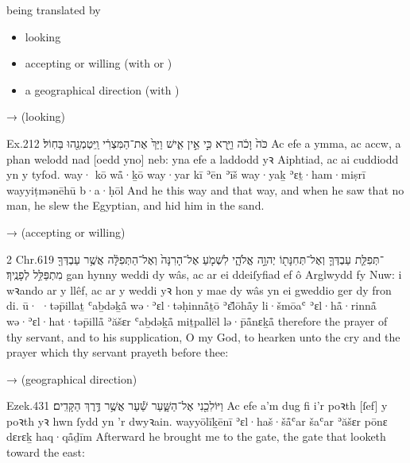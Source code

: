 \begin{frame}{ being translated by }
	\begin{itemize}
		\item looking\hfill{}
		\item accepting or willing {\small (with  or )}\hfill{}
		\item a geographical direction {\small (with )}\hfill{}
	\end{itemize}
\end{frame}


\begin{frame}{\exwref {} →  (looking)}
	\exstep
	\begin{example}{Ex.}{2}{12}{}{}
		\quoling
		{ כֹּה֙ וָכֹ֔ה וַיַּ֖רְא כִּ֣י אֵ֣ין אִ֑ישׁ וַיַּךְ֙ אֶת־הַמִּצְרִ֔י וַֽיִּטְמְנֵ֖הוּ בַּחֽוֹל׃}
		{Ac efe a  ymma, ac accw, a phan welodd nad [oedd yno] neb: yna efe a laddodd yꝛ Aiphtiad, ac ai cuddiodd yn y tyfod.}
		{way· kō wå̄·ḵō way·yar kī ʾēn ʾīš way·yaḵ ʾɛṯ·ham·miṣrī wayyiṭmənēhū b·a·ḥōl}
		{And he  this way and that way, and when he saw that  no man, he slew the Egyptian, and hid him in the sand.}
	\end{example}
\end{frame}


\begin{frame}{\exwref {} →  (accepting or willing)}
	\exstep
	\begin{example}{2 Chr.}{6}{19}{}{}
		\quoling
		{ ־תְּפִלַּ֧ת עַבְדְּךָ֛ וְאֶל־תְּחִנָּת֖וֹ יְהוָ֣ה אֱלֹהָ֑י לִשְׁמֹ֤עַ אֶל־הָרִנָּה֙ וְאֶל־הַתְּפִלָּ֔ה אֲשֶׁ֥ר עַבְדְּךָ֖ מִתְפַּלֵּ֥ל לְפָנֶֽיךָ׃}
		{ gan hynny  weddi dy wâs, ac ar ei ddeiſyfiad ef ô Arglwydd fy Nuw: i wꝛando ar y llêf, ac ar y weddi yꝛ hon y mae dy wâs yn ei gweddio ger dy fron di.}
		{ū· ·təp̄illaṯ ʿaḇdəḵå̄ wə·ʾɛl·təḥinnå̄ṯō {\YHWH} ʾɛ̆lōhå̄y li·šmōaʿ ʾɛl·hå̄·rinnå̄ wə·ʾɛl·hat·təp̄illå̄ ʾăšɛr ʿaḇdəḵå̄ miṯpallēl lə·p̄å̄nɛḵå̄}
		{ therefore  the prayer of thy servant, and to his supplication, O {\LORD} my God, to hearken unto the cry and the prayer which thy servant prayeth before thee:}
	\end{example}
\end{frame}


\begin{frame}{\exwref {} →  (geographical direction)}
	\exstep
	\begin{example}{Ezek.}{43}{1}{}{}
		\quoling
		{וַיּוֹלִכֵ֖נִי אֶל־הַשָּׁ֑עַר שַׁ֕עַר אֲשֶׁ֥ר  דֶּ֥רֶךְ הַקָּדִֽים׃}
		{Ac efe a’m dug fi i’r poꝛth [ſef] y poꝛth yꝛ hwn ſydd yn   ’r dwyꝛain.}
		{wayyōlīḵēnī ʾɛl·haš·šå̄ʿar šaʿar ʾăšɛr pōnɛ dɛrɛḵ haq·qå̄ḏīm}
		{Afterward he brought me to the gate,  the gate that looketh toward the east:}
	\end{example}
\end{frame}


